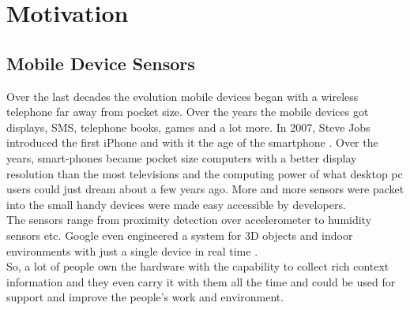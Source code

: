 \section{Motivation}

\subsection{Mobile Device Sensors}
Over the last decades the evolution mobile devices began with a wireless telephone far away from pocket size. Over the years the mobile devices got displays, SMS, telephone books, games and a lot more. In 2007, Steve Jobs introduced the first iPhone and with it the age of the smartphone  \cite{laugesen2010factors}. Over the years, smart-phones became pocket size computers with a better display resolution than the most televisions and the computing power of what desktop pc users could just dream about a few years ago. More and more sensors were packet into the small handy devices were made easy accessible by developers.\\
The sensors range from proximity detection over accelerometer to humidity sensors etc. Google even engineered a system for 3D objects and indoor environments with just a single device in real time \cite{schops20153d}.\\
So, a lot of people own the hardware with the capability to collect rich context information and they even carry it with them all the time and could be used for support and improve the people's work and environment.


